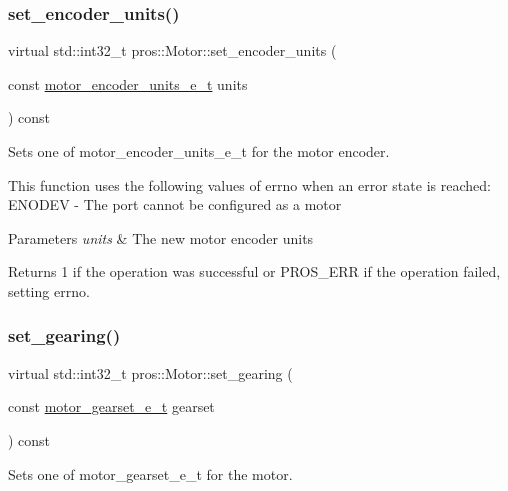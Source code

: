 \subsubsection{\texorpdfstring{set\+\_\+encoder\+\_\+units()}{set\_encoder\_units()}}
{\footnotesize\ttfamily virtual std\+::int32\+\_\+t pros\+::\+Motor\+::set\+\_\+encoder\+\_\+units (\begin{DoxyParamCaption}\item[{const \hyperlink{motors_8h_a6677ba23760c558fd8b7b4e1e00a6123}{motor\+\_\+encoder\+\_\+units\+\_\+e\+\_\+t}}]{units }\end{DoxyParamCaption}) const\hspace{0.3cm}{\ttfamily [virtual]}}

Sets one of motor\+\_\+encoder\+\_\+units\+\_\+e\+\_\+t for the motor encoder.

This function uses the following values of errno when an error state is reached\+: E\+N\+O\+D\+EV -\/ The port cannot be configured as a motor


\begin{DoxyParams}{Parameters}
{\em units} & The new motor encoder units\\
\hline
\end{DoxyParams}
\begin{DoxyReturn}{Returns}
1 if the operation was successful or P\+R\+O\+S\+\_\+\+E\+RR if the operation failed, setting errno. 
\end{DoxyReturn}
\mbox{\label{classpros_1_1Motor_a3adf8b737ad2e4ebb5f000401c536fed}} 
\subsubsection{\texorpdfstring{set\+\_\+gearing()}{set\_gearing()}}
{\footnotesize\ttfamily virtual std\+::int32\+\_\+t pros\+::\+Motor\+::set\+\_\+gearing (\begin{DoxyParamCaption}\item[{const \hyperlink{motors_8h_aa2f1c305c998abc3bf8dd1f76fa4da8b}{motor\+\_\+gearset\+\_\+e\+\_\+t}}]{gearset }\end{DoxyParamCaption}) const\hspace{0.3cm}{\ttfamily [virtual]}}

Sets one of motor\+\_\+gearset\+\_\+e\+\_\+t for the motor.

